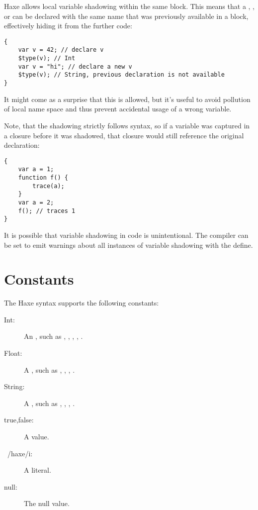 Haxe allows local variable shadowing within the same block. This means that
a , , or  can be declared with the same name that was previously available in a block, effectively hiding it from the further code:

\begin{lstlisting}
{
	var v = 42; // declare v
	$type(v); // Int
	var v = "hi"; // declare a new v
	$type(v); // String, previous declaration is not available
}
\end{lstlisting}

It might come as a surprise that this is allowed, but it's useful to avoid pollution of local name space and thus prevent accidental usage of a wrong variable.

Note, that the shadowing strictly follows syntax, so if a variable was captured
in a closure before it was shadowed, that closure would still reference the
original declaration:

\begin{lstlisting}
{
	var a = 1;
	function f() {
	    trace(a);
	}
	var a = 2;
	f(); // traces 1
}
\end{lstlisting}


It is possible that variable shadowing in code is unintentional. The compiler can be set to emit warnings about all instances of variable shadowing with the  define.


\section{Constants}
\label{expression-constants}

The Haxe syntax supports the following constants:

\begin{description}
	\item[Int:] An , such as , , , , .
	\item[Float:] A , such as , , , .
	\item[String:] A , such as , , , .
	\item[true,false:] A  value.
	\item[~/haxe/i:] A  literal.
	\item[null:] The null value.
\end{description}

